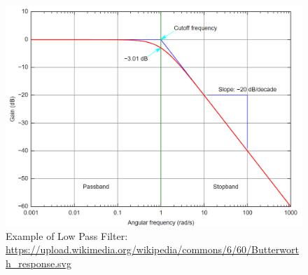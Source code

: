 \begin{figure}[h!]
	\centering
	\includegraphics[scale = .5]{low_pass.png} %
	\caption{Example of Low Pass Filter: \url{https://upload.wikimedia.org/wikipedia/commons/6/60/Butterworth_response.svg}}
	\label{fig:lowpass}
\end{figure}    
 
